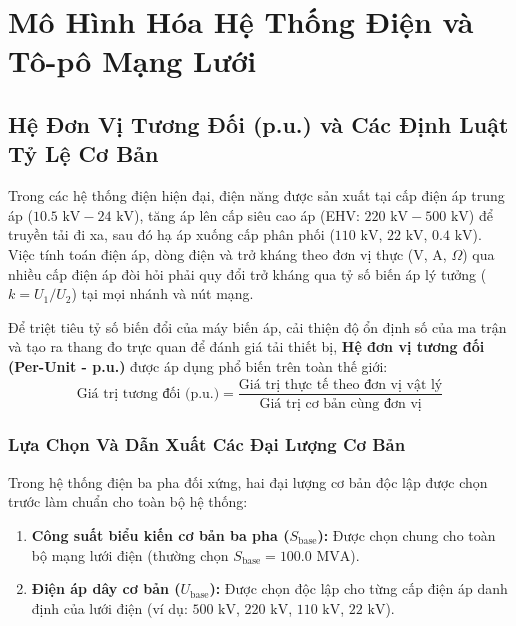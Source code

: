 \documentclass[12pt,a4paper,oneside]{report}
\begin{document}
\chapter{Mô Hình Hóa Hệ Thống Điện và Tô-pô Mạng Lưới}

\section{Hệ Đơn Vị Tương Đối (p.u.) và Các Định Luật Tỷ Lệ Cơ Bản}
Trong các hệ thống điện hiện đại, điện năng được sản xuất tại cấp điện áp trung áp ($10.5\text{ kV} - 24\text{ kV}$), tăng áp lên cấp siêu cao áp (EHV: $220\text{ kV} - 500\text{ kV}$) để truyền tải đi xa, sau đó hạ áp xuống cấp phân phối ($110\text{ kV}$, $22\text{ kV}$, $0.4\text{ kV}$). Việc tính toán điện áp, dòng điện và trở kháng theo đơn vị thực (V, A, $\Omega$) qua nhiều cấp điện áp đòi hỏi phải quy đổi trở kháng qua tỷ số biến áp lý tưởng ($k = U_1 / U_2$) tại mọi nhánh và nút mạng.

Để triệt tiêu tỷ số biến đổi của máy biến áp, cải thiện độ ổn định số của ma trận và tạo ra thang đo trực quan để đánh giá tải thiết bị, \textbf{Hệ đơn vị tương đối (Per-Unit - p.u.)} được áp dụng phổ biến trên toàn thế giới:
\begin{equation}
\text{Giá trị tương đối (p.u.)} = \frac{\text{Giá trị thực tế theo đơn vị vật lý}}{\text{Giá trị cơ bản cùng đơn vị}}
\end{equation}

\subsection{Lựa Chọn Và Dẫn Xuất Các Đại Lượng Cơ Bản}
Trong hệ thống điện ba pha đối xứng, hai đại lượng cơ bản độc lập được chọn trước làm chuẩn cho toàn bộ hệ thống:
\begin{enumerate}
    \item \textbf{Công suất biểu kiến cơ bản ba pha ($S_{\text{base}}$):} Được chọn chung cho toàn bộ mạng lưới điện (thường chọn $S_{\text{base}} = 100.0\text{ MVA}$).
    \item \textbf{Điện áp dây cơ bản ($U_{\text{base}}$):} Được chọn độc lập cho từng cấp điện áp danh định của lưới điện (ví dụ: $500\text{ kV}$, $220\text{ kV}$, $110\text{ kV}$, $22\text{ kV}$).
\end{enumerate}
\end{document}
